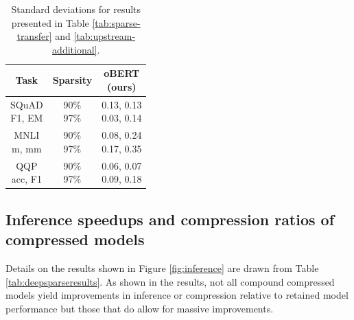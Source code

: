 \documentclass[11pt]{article}
\begin{document}
\begin{table}[htb!]
      \centering
            {\small 
                \begin{tabular}{cc|c}
                \toprule 
                Task & Sparsity & \makecell{oBERT \\(ours)} \\
                \midrule
                \makecell{SQuAD \\ F1, EM} & \makecell{90\% \\ 97\%} & \makecell{0.13, 0.13 \\ 0.03, 0.14} \\
                \midrule
                \makecell{MNLI \\ m, mm} & \makecell{90\% \\ 97\%} & \makecell{0.08, 0.24 \\ 0.17, 0.35} \\
                \midrule
                \makecell{QQP \\ acc, F1} & \makecell{90\% \\ 97\%} & \makecell{0.06, 0.07 \\ 0.09, 0.18} \\
                \bottomrule
                \end{tabular}
            }
    \caption{Standard deviations for results presented in Table \ref{tab:sparse-transfer} and \ref{tab:upstream-additional}.}
    \label{tab:sparse-transfer-deviations}
\end{table}

\subsection{Inference speedups and compression ratios of compressed models}
Details on the results shown in Figure \ref{fig:inference} are drawn from Table \ref{tab:deepsparseresults}. As shown in the results, not all compound compressed models yield improvements in inference or compression relative to retained model performance but those that do allow for massive improvements.
\end{document}
